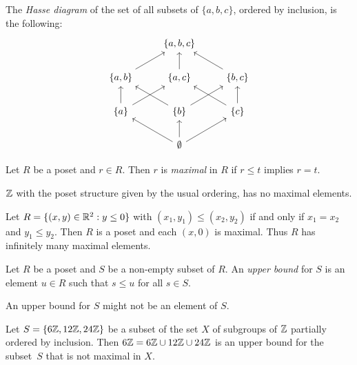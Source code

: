 \begin{example}
   The \emph{Hasse diagram} of the set of all subsets of $\{a,b,c\}$, 
   ordered by inclusion, is the following:
\[\begin{tikzcd}
	& {\{a,b,c\}} \\
	{\{a,b\}} & {\{a,c\}} & {\{b,c\}} \\
	{\{a\}} & {\{b\}} & {\{c\}} \\
	& \emptyset
	\arrow[from=2-1, to=1-2]
	\arrow[from=2-2, to=1-2]
	\arrow[from=2-3, to=1-2]
	\arrow[from=3-1, to=2-1]
	\arrow[from=3-1, to=2-2]
	\arrow[from=3-2, to=2-1]
	\arrow[from=3-2, to=2-3]
	\arrow[from=3-3, to=2-2]
	\arrow[from=3-3, to=2-3]
	\arrow[from=4-2, to=3-1]
	\arrow[from=4-2, to=3-2]
	\arrow[from=4-2, to=3-3]
\end{tikzcd}\]
\end{example}

\begin{definition}
    Let $R$ be a poset and $r\in R$. Then $r$ is \emph{maximal} in $R$ if 
    $r\leq t$ implies $r=t$. 
\end{definition}

\begin{example}
    $\mathbb{Z}$ with the poset structure given by the usual ordering, has no maximal elements. 
\end{example}

\begin{example}
Let $R=\{(x,y)\in\mathbb{R}^2:y\leq0\}$ with $(x_1,y_1)\leq(x_2,y_2)$ if and only if $x_1=x_2$ and $y_1\leq y_2$. Then
$R$ is a poset and each $(x,0)$ is maximal. Thus $R$ has infinitely many maximal elements.
\end{example}

\begin{definition}
    Let $R$ be a poset and $S$ be a non-empty subset of $R$. An \emph{upper bound}
    for $S$ is an element $u\in R$ such that $s\leq u$ for all $s\in S$. 
\end{definition}

An upper bound for $S$ might not be an element of $S$. 

\begin{example}
    Let $S=\{6\mathbb{Z},12\mathbb{Z},24\mathbb{Z}\}$ be a subset of the set $X$ 
    of subgroups of $\mathbb{Z}$ partially ordered by 
    inclusion. Then 
    $6\mathbb{Z}=6\mathbb{Z}\cup 12\mathbb{Z}\cup 24\mathbb{Z}$ is an upper bound for the subset~$S$ 
    that is not maximal in $X$. 
\end{example}

